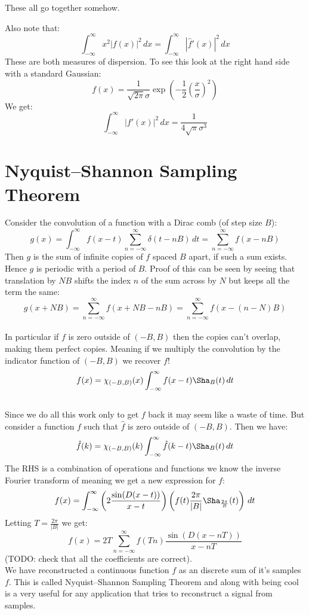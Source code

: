 \documentclass[12pt]{report}
\begin{document}
These all go together somehow.

Also note that:
\[\int_{-\infty}^{\infty}x^2|f(x)|^2\,dx = \int_{-\infty}^{\infty}|\hat{f}'(x)|^2\,dx\]
These are both measures of dispersion.
To see this look at the right hand side with a standard Gaussian:
\[f(x) = \frac{1}{\sqrt{2\pi}\sigma}\exp\left(-\frac{1}{2}\left(\frac{x}{\sigma}\right)^2 \right)\]
We get:
\[\int_{-\infty}^{\infty}|f'(x)|^2\,dx = \frac{1}{4\sqrt{\pi}\sigma^3} \]

\section{Nyquist–Shannon Sampling Theorem}
Consider the convolution of a function with a Dirac comb (of step size $B$):
\[g(x) = \int_{-\infty}^{\infty}f(x-t)\sum_{n=-\infty}^{\infty}\delta(t-nB)\,dt = \sum_{n=-\infty}^{\infty}f(x-nB)\]
Then $g$ is the sum of infinite copies of $f$ spaced $B$ apart, if such a sum exists.
Hence $g$ is periodic with a period of $B$. 
Proof of this can be seen by seeing that translation by $NB$ shifts the index $n$ of the sum across by $N$ but keeps all the term the same:
\[g(x+NB) = \sum_{n=-\infty}^{\infty}f(x+NB-nB) = \sum_{n=-\infty}^{\infty}f(x-(n-N)B) \]
\\

In particular if $f$ is zero outside of $(-B,B)$ then the copies can't overlap, making them perfect copies.
Meaning if we multiply the convolution by the indicator function of $(-B,B)$ we recover $f$!
\[f(x) = \chi_{(-B,B)}(x)\int_{-\infty}^{\infty}f(x-t)\Sha_B(t)\,dt\]
\\

Since we do all this work only to get $f$ back it may seem like a waste of time.
But consider a function $f$ such that $\hat{f}$ is zero outside of $(-B,B)$.
Then we have:
\[\hat{f}(k) = \chi_{(-B,B)}(k)\int_{-\infty}^{\infty}\hat{f}(k-t)\Sha_B(t)\,dt\]
The RHS is a combination of operations and functions we know the inverse Fourier transform of meaning we get a new expression for $f$:
\[f(x) = \int_{-\infty}^{\infty}\left(2\frac{\sin(D(x-t))}{x-t}\right)\left(f(t)\frac{2\pi}{|B|}\Sha_{\frac{2\pi}{B}}(t)\right)\,dt \]
Letting $T = \frac{2\pi}{|B|}$ we get:
\[ f(x) = 2T\sum_{n=-\infty}^{\infty}f(Tn)\frac{\sin(D(x-nT))}{x-nT} \]
(TODO: check that all the coefficients are correct).
\\

We have reconstructed a continuous function $f$ as an discrete sum of it's samples $f$.
This is called Nyquist–Shannon Sampling Theorem and along with being cool is a very useful for any application that tries to reconstruct a signal from samples.
\end{document}
